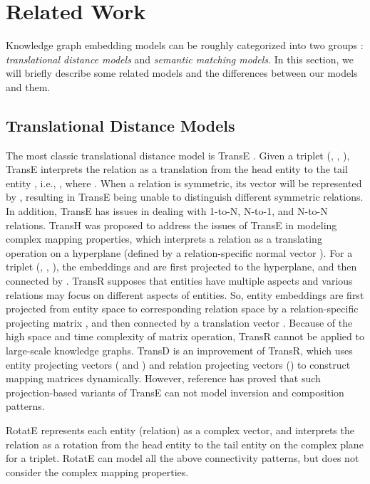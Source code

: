 \documentclass[conference]{IEEEtran}
\begin{document}
\section{Related Work}
Knowledge graph embedding models can be roughly categorized into two groups \cite{Survey}: \textit{translational distance models} and \textit{semantic matching models}. In this section, we will briefly describe some related models and the differences between our models and them.

\subsection{Translational Distance Models}
The most classic translational distance model is TransE \cite{TransE}. Given a triplet (, , ), TransE interprets the relation as a translation  from the head entity  to the tail entity , i.e., , where . When a relation is symmetric, its vector will be represented by , resulting in TransE being unable to distinguish different symmetric relations. In addition, TransE has issues in dealing with 1-to-N, N-to-1, and N-to-N relations. TransH \cite{TransH} was proposed to address the issues of TransE in modeling complex mapping properties, which interprets a relation as a translating operation  on a hyperplane (defined by a relation-specific normal vector ). For a triplet (, , ), the embeddings  and  are first projected to the hyperplane, and then connected by . TransR \cite{TransR} supposes that entities have multiple aspects and various relations may focus on different aspects of entities. So, entity embeddings are first projected from entity space to corresponding relation space by a relation-specific projecting matrix , and then connected by a translation vector . Because of the high space and time complexity of matrix operation, TransR cannot be applied to large-scale knowledge graphs. TransD \cite{TransD} is an improvement of TransR, which uses entity projecting vectors ( and ) and relation projecting vectors () to construct mapping matrices dynamically. However, reference \cite{RotatE} has proved that such projection-based variants of TransE can not model inversion and composition patterns.

RotatE \cite{RotatE} represents each entity (relation) as a complex vector, and interprets the relation as a rotation from the head entity to the tail entity on the complex plane for a triplet. RotatE can model all the above connectivity patterns, but does not consider the complex mapping properties.
\end{document}
